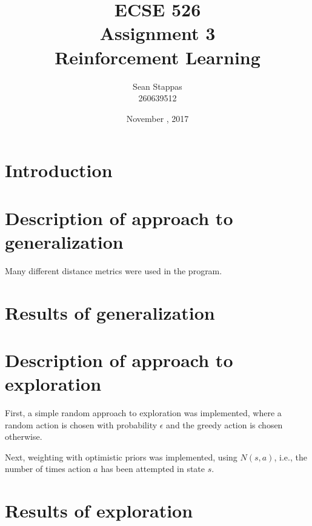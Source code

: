 \documentclass[a4paper,titlepage]{article}
\title{
	\textbf{ECSE 526 \\ Assignment 3}
	\\ \large Reinforcement Learning
}
\author{Sean Stappas \\ 260639512}
\date{November \nth{7}, 2017}
\begin{document}
	\sloppy
	\maketitle
	\twocolumn
	
	\section*{Introduction}
	
	
	\section{Description of approach to generalization}
	
	Many different distance metrics were used in the program.
	
	
	\section{Results of generalization}
	
	
	\section{Description of approach to exploration}
	
	First, a simple random approach to exploration was implemented, where a random action is chosen with probability $\epsilon$ and the greedy action is chosen otherwise.
	
	
	Next, weighting with optimistic priors was implemented, using $N(s, a)$, i.e., the number of times action $a$ has been attempted in state $s$.
	
	
	
	\section{Results of exploration}
	
\end{document}
